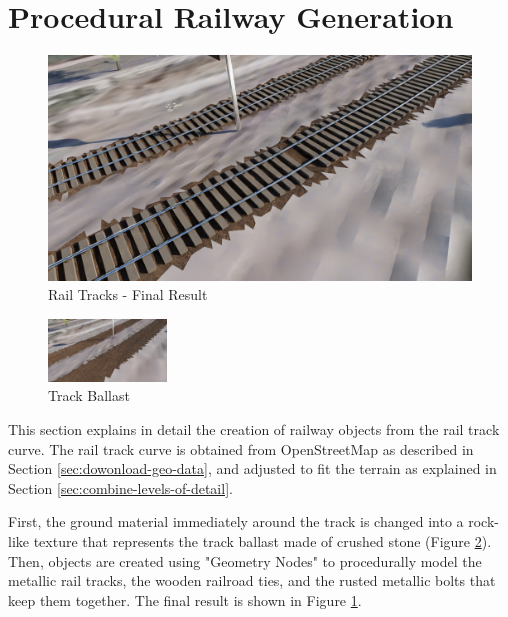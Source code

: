 \section{Procedural Railway Generation}
\label{sec:procedural-railway-generation}


\begin{figure}[H]
    \centering
    \includegraphics[width=.95\textwidth]{src/img/procedural-tracks/3b-rails-result.jpg}
    \caption{Rail Tracks - Final Result}
    \label{fig:track-final-result}
\end{figure}

\begin{figure}
    \centering
    \includegraphics[width=0.28\textwidth]{src/img/procedural-tracks/1-trackbed.jpg}
    \caption{Track Ballast}
    \label{fig:track-ballast-pic}
\end{figure}

This section explains in detail the creation of railway objects from the rail track curve. The rail track curve is obtained from OpenStreetMap as described in Section \ref{sec:dowonload-geo-data}, and adjusted to fit the terrain as explained in Section \ref{sec:combine-levels-of-detail}.

First, the ground material immediately around the track is changed into a rock-like texture that represents the track ballast made of crushed stone (Figure \ref{fig:track-ballast-pic}). Then, objects are created using "Geometry Nodes" to procedurally model the metallic rail tracks, the wooden railroad ties, and the rusted metallic bolts that keep them together. The final result is shown in Figure \ref{fig:track-final-result}.

